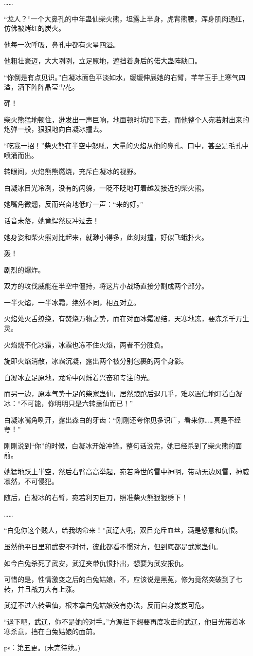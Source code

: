 \begin{this_body}
……

“龙人？”一个大鼻孔的中年蛊仙柴火熊，坦露上半身，虎背熊腰，浑身肌肉通红，仿佛被烤红的炭火。

他每一次呼吸，鼻孔中都有火星四溢。

他粗壮豪迈，大大咧咧，立足原地，遮挡着身后的偌大蛊阵缺口。

“你倒是有点见识。”白凝冰面色平淡如水，缓缓伸展她的右臂，芊芊玉手上寒气四溢，洒下阵阵晶莹雪花。

砰！

柴火熊猛地顿住，迸发出一声巨响，地面顿时坑陷下去，而他整个人宛若射出来的炮弹一般，狠狠地向白凝冰撞去。

“吃我一招！”柴火熊在半空中怒吼，大量的火焰从他的鼻孔、口中，甚至是毛孔中喷涌而出。

转眼间，火焰熊熊燃烧，充斥白凝冰的视野。

白凝冰目光冷冽，没有的闪躲，一眨不眨地盯着越发接近的柴火熊。

她嘴角微翘，反而兴奋地低咛一声：“来的好。”

话音未落，她竟悍然反冲过去！

她身姿和柴火熊对比起来，就渺小得多，此刻对撞，好似飞蛾扑火。

轰！

剧烈的爆炸。

双方的攻伐威能在半空中僵持，将这片小战场直接分割成两个部分。

一半火焰，一半冰霜，绝然不同，相互对立。

火焰处火舌缭绕，有焚烧万物之势，而在对面冰霜凝结，天寒地冻，要冻杀千万生灵。

火焰烧不化冰霜，冰霜也冻不住火焰，两者不分胜负。

旋即火焰消散，冰霜沉凝，露出两个被分别包裹的两个身影。

白凝冰立足原地，龙瞳中闪烁着兴奋和专注的光。

而另一边，原本气势十足的柴家蛊仙，居然踉跄后退几乎，难以置信地盯着白凝冰：“不可能，你明明只是六转蛊仙而已！”

白凝冰嘴角咧开，露出森白的牙齿：“刚刚还夸你见多识广，看来你……真是不经夸！”

刚刚说到“你”的时候，白凝冰开始冲锋。整句话说完，她已经杀到了柴火熊的面前。

她猛地跃上半空，然后右臂高高举起，宛若降世的雪中神明，带动无边风雪，神威凛然，不可侵犯。

随后，白凝冰的右臂，宛若利刃巨刀，照准柴火熊狠狠劈下！

……

“白兔你这个贱人，给我纳命来！”武辽大吼，双目充斥血丝，满是怒意和仇恨。

虽然他平日里和武安不对付，彼此都看不惯对方，但到底都是武家蛊仙。

如今白兔杀死了武安，武辽夹带仇恨扑出，想要为武安报仇。

可惜的是，性情激变之后的白兔姑娘，不，应该说是黑莬，修为竟然突破到了七转，并且战力大有上涨。

武辽不过六转蛊仙，根本拿白兔姑娘没有办法，反而自身岌岌可危。

“退下吧，武辽，你不是她的对手。”方源拦下想要再度攻击的武辽，他目光带着冰寒杀意，挡在白兔姑娘的面前。

ps：第五更。(未完待续。)

\end{this_body}

